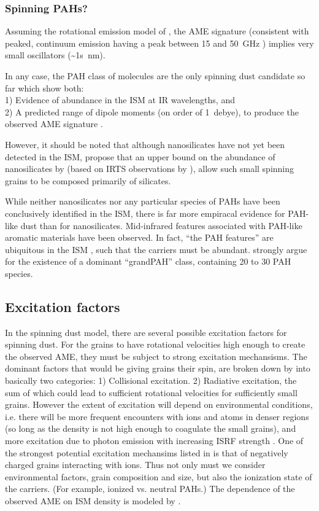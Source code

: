      \subsubsection{Spinning PAHs?}
       Assuming the rotational emission model of \cite{draine98b}, the AME signature (consistent with peaked, continuum emission having a peak between 15 and 50~GHz ) implies very small oscillators (\textasciitilde{}1s~nm).

       In any case, the PAH class of molecules are the only spinning dust candidate so far which show both: \\
       1) Evidence of abundance in the ISM at IR wavelengths, and \\
       2) A predicted range of dipole moments (on order of 1~debye), to produce the observed AME signature \citep{draine98b, lovas05, thorwirth07}.

       However, it should be noted that although nanosilicates have not yet been detected in the ISM, \cite{hensley17a} propose that an upper bound on the abundance of nanosilicates by \cite{li01} (based on IRTS observations by \cite{onaka96}), allow such small spinning grains to be composed primarily of silicates.

    While neither nanosilicates nor any particular species of PAHs have been conclusively identified in the ISM, there is far more empiracal evidence for PAH-like dust than for nanosilicates. Mid-infrared features associated with PAH-like aromatic materials have been observed. In fact, ``the PAH features'' are ubiquitous in the ISM \citep{giard94,onaka96,onaka00}, such that the carriers must be abundant. \cite{andrews15} strongly argue for the  existence of a dominant ``grandPAH'' class, containing 20 to 30 PAH species.

     \subsection{Excitation factors}
       In the spinning dust model, there are several possible excitation factors for spinning dust. For the grains to have rotational velocities high enough to create the observed AME, they must be subject to strong excitation mechansisms. The dominant factors that would be giving grains their spin, are broken down by \cite{draine11} into basically two categories: 1) Collisional excitation. 2) Radiative excitation, the sum of which could lead to sufficient rotational velocities for sufficiently small grains. However the extent of excitation will depend on environmental conditions, i.e. there will be more frequent encounters with ions and atoms in denser regions (so long as the density is not high enough to coagulate the small grains), and more excitation due to photon emission with increasing ISRF strength \citep{ali-haimoud09, ali-haimoud14}. One of the strongest potential excitation mechansims listed in \cite{draine11} is that of negatively charged grains interacting with ions. Thus not only must we consider environmental factors, grain composition and size, but also the ionization state of the carriers. (For example, ionized vs. neutral PAHs.) The dependence of the observed AME on ISM density is modeled by \cite{ali-haimoud10}.

